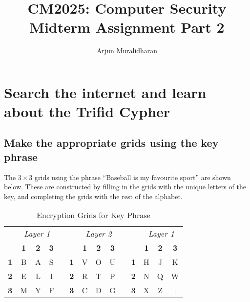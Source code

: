 \title{CM2025: Computer Security \\ Midterm Assignment Part 2}
\author{Arjun Muralidharan}



\section{Search the internet and learn about the Trifid Cypher}
\subsection{Make the appropriate grids using the key phrase}

The $3 \times 3$ grids using the phrase ``Baseball is my favourite sport'' are shown below. These are constructed by filling in the grids with the unique letters of the key, and completing the grids with the rest of the alphabet.

\begin{table}[H]
	\caption{Encryption Grids for Key Phrase}
	\centering
	\begin{tabular}{cccccccccccccc}
	\multicolumn{1}{l}{} & \multicolumn{3}{c}{\textit{Layer 1}} & \multicolumn{1}{l}{} & \multicolumn{1}{l}{} & \multicolumn{3}{c}{\textit{Layer 2}}          & \multicolumn{1}{l}{} & \multicolumn{1}{l}{} & \multicolumn{3}{c}{\textit{Layer 1}}          \\
						 & \textbf{1} & \textbf{2} & \textbf{3} & \textbf{}            & \textbf{}            & \textbf{1} & \textbf{2} & \textbf{3} & \textbf{}            & \textbf{}            & \textbf{1} & \textbf{2} & \textbf{3} \\
	\textbf{1}           & B          & A          & S          &                      & \textbf{1}           & V          & O          & U          &                      & \textbf{1}           & H          & J          & K          \\
	\textbf{2}           & E          & L          & I          &                      & \textbf{2}           & R          & T          & P          &                      & \textbf{2}           & N          & Q          & W          \\
	\textbf{3}           & M          & Y          & F          &                      & \textbf{3}           & C          & D          & G          &                      & \textbf{3}           & X          & Z          & +         
	\end{tabular}
	\end{table}

